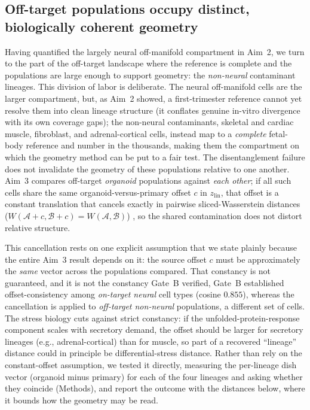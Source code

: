 \documentclass[11pt]{article}
\newcommand{\zlin}{\ensuremath{z_{\mathrm{lin}}}}
\begin{document}
\subsection{Off-target populations occupy distinct, biologically coherent geometry}
Having quantified the largely neural off-manifold compartment in Aim~2, we turn to the part of the
off-target landscape where the reference is complete and the populations are large enough to support
geometry: the \emph{non-neural} contaminant lineages. This division of labor is deliberate. The neural
off-manifold cells are the larger compartment, but, as Aim~2 showed, a first-trimester reference cannot
yet resolve them into clean lineage structure (it conflates genuine in-vitro divergence with its own
coverage gaps); the non-neural contaminants, skeletal and cardiac muscle, fibroblast, and
adrenal-cortical cells, instead map to a \emph{complete} fetal-body reference and number in the
thousands, making them the compartment on which the geometry method can be put to a fair test. The
disentanglement failure does not invalidate the geometry of these populations relative to one another.
Aim~3 compares off-target \emph{organoid} populations against \emph{each
other}; if all such cells share the same organoid-versus-primary offset $c$ in \zlin, that offset is a
constant translation that cancels exactly in pairwise sliced-Wasserstein distances
($W(\mathcal{A}{+}c,\mathcal{B}{+}c)=W(\mathcal{A},\mathcal{B})$) \citep{bonneel2015sliced}, so the
shared contamination does not distort relative structure.

This cancellation rests on one explicit assumption that we state plainly because the entire Aim~3 result
depends on it: the source offset $c$ must be approximately the \emph{same} vector across the populations
compared. That constancy is not guaranteed, and it is not the constancy Gate~B verified, Gate~B
established offset-consistency among \emph{on-target neural} cell types (cosine $0.855$), whereas the
cancellation is applied to \emph{off-target non-neural} populations, a different set of cells. The stress
biology cuts against strict constancy: if the unfolded-protein-response component scales with secretory
demand, the offset should be larger for secretory lineages (e.g., adrenal-cortical) than for muscle, so
part of a recovered ``lineage'' distance could in principle be differential-stress distance. Rather than
rely on the constant-offset assumption, we tested it directly, measuring the per-lineage dish vector
(organoid minus primary) for each of the four lineages and asking whether they coincide (Methods), and
report the outcome with the distances below, where it bounds how the geometry may be read.
\end{document}
